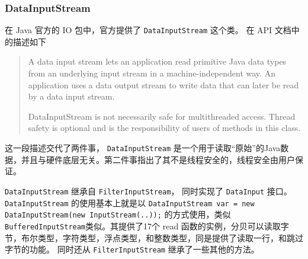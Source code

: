 
\subsubsection{DataInputStream}
\label{sec:uml:input:datainputstream}

在 Java 官方的 IO 包中，官方提供了 \lstinline|DataInputStream| 这个类。
在 API 文档中的描述如下
\begin{quote}
  A data input stream lets an application read primitive Java data types from an underlying input stream in a machine-independent way. 
  An application uses a data output stream to write data that can later be read by a data input stream.

  DataInputStream is not necessarily safe for multithreaded access. Thread safety is optional and is the responsibility of users of methods in this class.
\end{quote}

这一段描述交代了两件事， \lstinline|DataInputStream| 是一个用于读取“原始”的Java数据，并且与硬件底层无关。第二件事指出了其不是线程安全的，线程安全由用户保证。

\lstinline|DataInputStream| 继承自 \lstinline|FilterInputStream|， 同时实现了 \lstinline|DataInput| 接口。
\lstinline|DataInputStream| 的使用基本上就是以 \lstinline|DataInputStream var = new DataInputStream(new InputStream(..));| 的方式使用，类似
\lstinline|BufferedInputStream|类似。其提供了17个 read 函数的实例，分贝可以读取字节，布尔类型，字符类型，浮点类型，和整数类型，同是提供了读取一行，和跳过字节的功能。
同时还从 \lstinline|FilterInputStream| 继承了一些其他的方法。

